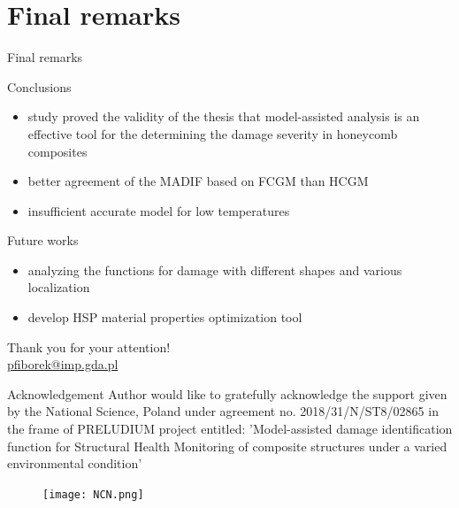 \documentclass[10pt,aspectratio=169]{beamer} %
\begin{document}
\section{Final remarks}
\begin{frame}[label=frame24]{Final remarks}
	\begin{alertblock}{Conclusions}
		\begin{itemize}
			\item study proved the validity of the thesis that model-assisted analysis is an effective tool for the determining the damage severity in honeycomb composites
			\item better agreement of the MADIF based on FCGM than HCGM
			\item insufficient accurate model for low temperatures
		\end{itemize}
	\end{alertblock}
\begin{alertblock}{Future works}
	\begin{itemize}
		\item analyzing the functions for damage with different shapes and various localization
		\item develop HSP material properties optimization tool
	\end{itemize}
\end{alertblock}
\end{frame}
{
	\begin{frame}[standout]
		Thank you for your attention!\\ \vspace{12pt}
		\scriptsize{\url{pfiborek@imp.gda.pl}}
		\begin{block}{Acknowledgement}
			\tiny
			Author would like to gratefully acknowledge the support given by the National Science, Poland under agreement no. 2018/31/N/ST8/02865 in the frame of PRELUDIUM project entitled: 'Model-assisted damage identification function for Structural Health Monitoring of composite structures under a varied environmental condition'
			\begin{figure}
				\texttt{[image: NCN.png]}
				\label{fig:NCN}
			\end{figure}
		\end{block}
	\end{frame}
}
\end{document}
